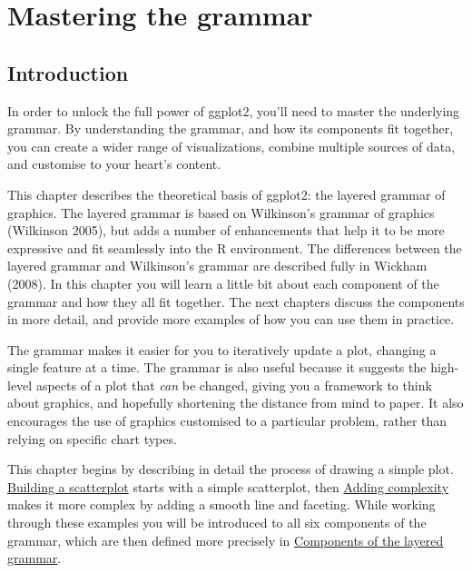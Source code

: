 \chapter{Mastering the grammar}\label{cha:mastery}

\section{Introduction}

In order to unlock the full power of ggplot2, you'll need to master the
underlying grammar. By understanding the grammar, and how its components
fit together, you can create a wider range of visualizations, combine
multiple sources of data, and customise to your heart's content.

This chapter describes the theoretical basis of ggplot2: the layered
grammar of graphics. The layered grammar is based on Wilkinson's grammar
of graphics (Wilkinson 2005), but adds a number of enhancements that
help it to be more expressive and fit seamlessly into the R environment.
The differences between the layered grammar and Wilkinson's grammar are
described fully in Wickham (2008). In this chapter you will learn a
little bit about each component of the grammar and how they all fit
together. The next chapters discuss the components in more detail, and
provide more examples of how you can use them in practice.

The grammar makes it easier for you to iteratively update a plot,
changing a single feature at a time. The grammar is also useful because
it suggests the high-level aspects of a plot that \emph{can} be changed,
giving you a framework to think about graphics, and hopefully shortening
the distance from mind to paper. It also encourages the use of graphics
customised to a particular problem, rather than relying on specific
chart types.

This chapter begins by describing in detail the process of drawing a
simple plot. \hyperref[sec:simple-plot]{Building a scatterplot} starts
with a simple scatterplot, then \hyperref[sec:complex-plot]{Adding
complexity} makes it more complex by adding a smooth line and faceting.
While working through these examples you will be introduced to all six
components of the grammar, which are then defined more precisely in
\hyperref[sec:components]{Components of the layered grammar}.


